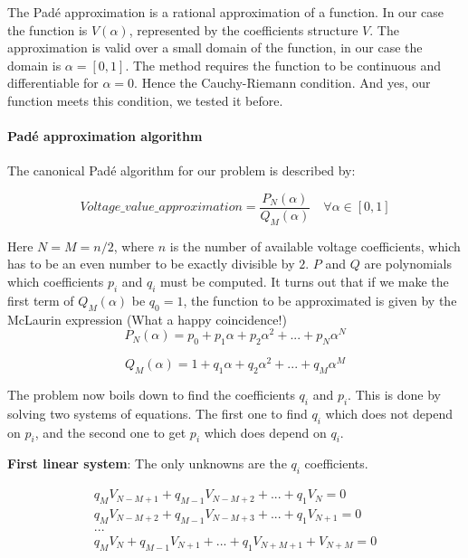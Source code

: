 \documentclass[nols,a4paper,twoside,notoc,fleqn]{tufte-book}
\begin{document}
The Pad\'e approximation is a rational approximation of a function. In our case the function is ${V}(\alpha)$, represented by the coefficients structure ${V}$. The approximation is valid over a small domain of the function, in our case the domain is $\alpha=[0,1]$. The method requires the function to be continuous and differentiable for $\alpha=0$. Hence the Cauchy-Riemann condition. And yes, our function meets this condition, we tested it before.

\paragraph{Pad\'e approximation algorithm}

The canonical Pad\'e algorithm for our problem is described by:

\begin{equation}
Voltage\_value\_approximation = \frac{P_N(\alpha)}{Q_M(\alpha)} \quad \forall \alpha \in [0,1]
\label{eq:pade_apprx}
\end{equation}

Here $N=M=n/2$, where $n$ is the number of available voltage coefficients, which has to be an even number to be exactly divisible by $2$. $P$ and $Q$ are polynomials which coefficients $p_i$ and $q_i$ must be computed. It turns out that if we make the first term of $Q_M(\alpha)$ be $q_0=1$, the function to be approximated is given by the McLaurin expression (What a happy coincidence!)
\begin{equation}
P_N(\alpha) = p_0 + p_1\alpha + p_2\alpha^2 + ... + p_N\alpha^N
\end{equation}

\begin{equation}
Q_M(\alpha) = 1 + q_1\alpha + q_2\alpha^2 + ... + q_M\alpha^M
\end{equation}



The problem now boils down to find the coefficients $q_i$ and $p_i$. This is done by solving two systems of equations. The first one to find $q_i$ which does not depend on $p_i$, and the second one to get $p_i$ which does depend on $q_i$.

\textbf{First linear system}: The only unknowns are the $q_i$ coefficients.

\begin{equation}
\begin{matrix}
q_M V_{N-M+1} + q_{M-1}V_{N-M+2}+...+q_1V_N = 0\\
q_M V_{N-M+2} + q_{M-1}V_{N-M+3}+...+q_1V_{N+1} = 0\\
...\\
q_M V_{N} + q_{M-1}V_{N+1}+...+q_1V_{N+M+1} + V_{N+M} = 0\\
\end{matrix}
\end{equation}
\end{document}
